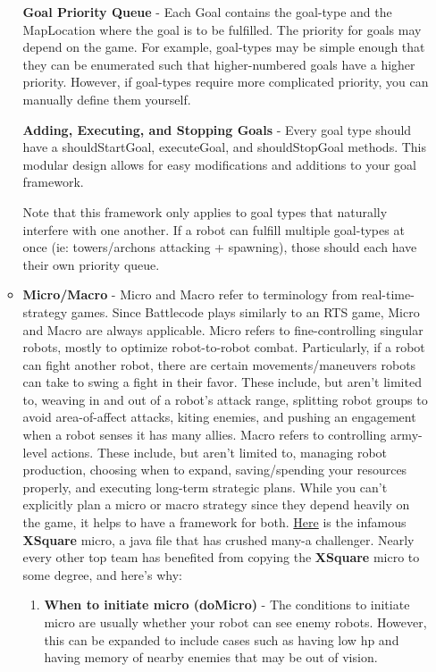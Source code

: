 \begin{enumerate}
\begin{itemize}
      \textbf{Goal Priority Queue} - Each Goal contains the goal-type and the MapLocation where the goal is to be fulfilled. The priority for goals may depend on the game. For example, goal-types may be simple enough that they can be enumerated such that higher-numbered goals have a higher priority. However, if goal-types require more complicated priority, you can manually define them yourself.

    \medskip

      \textbf{Adding, Executing, and Stopping Goals} - Every goal type should have a shouldStartGoal, executeGoal, and shouldStopGoal methods. This modular design allows for easy modifications and additions to your goal framework.

    \medskip

      Note that this framework only applies to goal types that naturally interfere with one another. If a robot can fulfill multiple goal-types at once (ie: towers/archons attacking + spawning), those should each have their own priority queue.
      \item \textbf{Micro/Macro} - Micro and Macro refer to terminology from real-time-strategy games. Since Battlecode plays similarly to an RTS game, Micro and Macro are always applicable. Micro refers to fine-controlling singular robots, mostly to optimize robot-to-robot combat. Particularly, if a robot can fight another robot, there are certain movements/maneuvers robots can take to swing a fight in their favor. These include, but aren't limited to, weaving in and out of a robot's attack range, splitting robot groups to avoid area-of-affect attacks, kiting enemies, and pushing an engagement when a robot senses it has many allies. Macro refers to controlling army-level actions. These include, but aren't limited to, managing robot production, choosing when to expand, saving/spending your resources properly, and executing long-term strategic plans. While you can't explicitly plan a micro or macro strategy since they depend heavily on the game, it helps to have a framework for both. \href{https://github.com/IvanGeffner/BTC24/blob/master/MicroManager.java}{Here} is the infamous \textbf{XSquare} micro, a java file that has crushed many-a challenger. Nearly every other top team has benefited from copying the \textbf{XSquare} micro to some degree, and here's why:
      \begin{enumerate}
          \item \textbf{When to initiate micro (doMicro)} - The conditions to initiate micro are usually whether your robot can see enemy robots. However, this can be expanded to include cases such as having low hp and having memory of nearby enemies that may be out of vision.

\end{enumerate}
\end{itemize}
\end{enumerate}
